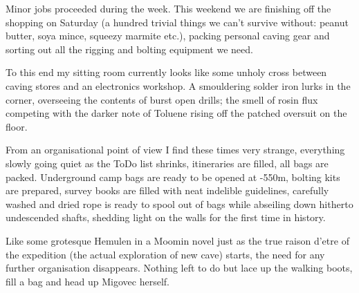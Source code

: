 Minor jobs proceeded during the week. This weekend we are finishing
off the shopping on Saturday (a hundred trivial things we can’t
survive without: peanut butter, soya mince, squeezy marmite etc.),
packing personal caving gear and sorting out all the rigging and
bolting equipment we need.

To this end my sitting room currently looks like some unholy cross
between caving stores and an electronics workshop. A smouldering
solder iron lurks in the corner, overseeing the contents of burst open
drills; the smell of rosin flux competing with the darker note of
Toluene rising off the patched oversuit on the floor. 

From an organisational point of view I find these times very strange,
everything slowly going quiet as the ToDo list shrinks, itineraries
are filled, all bags are packed. Underground camp bags are ready to be
opened at -550m, bolting kits are prepared, survey books are filled
with neat indelible guidelines, carefully washed and dried rope is
ready to spool out of bags while abseiling down hitherto undescended
shafts, shedding light on the walls for the first time in history.

Like some grotesque Hemulen in a Moomin novel just as the true raison d'etre of the expedition (the actual exploration of new cave) starts, the need for any further organisation disappears. Nothing left to do but lace up the walking boots, fill a bag and head up Migovec herself.

